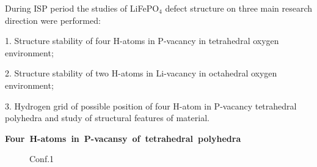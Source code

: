 During ISP period the studies of LiFePO$_4$ defect structure on three main research direction were performed:

1. Structure stability of four H-atoms in P-vacancy in tetrahedral oxygen environment;

2. Structure stability of two H-atoms in Li-vacancy in octahedral oxygen environment;

3. Hydrogen grid of possible position of four H-atom in P-vacancy tetrahedral polyhedra and study of structural features of material.

\noindent\mbox{\textbf{Four H-atoms in P-vacansy of tetrahedral polyhedra}}

\begin{figure}[h]
\begin{minipage}[h]{0.3\linewidth}
 Conf.1 \\
\end{minipage}
\hfill
\begin{minipage}[h]{0.3\linewidth}

\end{minipage}
\end{figure}
